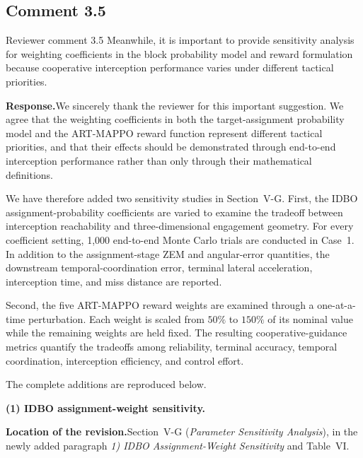 \documentclass[11pt]{article}
\newcommand{\rsp}{\medskip\noindent\textbf{Response.}\quad}
\newcommand{\loc}{\medskip\noindent\textbf{Location of the revision.}\quad}
\begin{document}

\subsection*{Comment 3.5}

\begin{reviewercomment}{Reviewer comment 3.5}
Meanwhile, it is important to provide sensitivity analysis for weighting
coefficients in the block probability model and reward formulation because
cooperative interception performance varies under different tactical
priorities.
\end{reviewercomment}

\rsp We sincerely thank the reviewer for this important suggestion. We agree
that the weighting coefficients in both the target-assignment probability
model and the ART-MAPPO reward function represent different tactical
priorities, and that their effects should be demonstrated through
end-to-end interception performance rather than only through their
mathematical definitions.

We have therefore added two sensitivity studies in
Section~V-G. First, the IDBO assignment-probability coefficients are varied
to examine the tradeoff between interception reachability and
three-dimensional engagement geometry. For every coefficient setting,
1,000 end-to-end Monte Carlo trials are conducted in Case~1. In addition to
the assignment-stage ZEM and angular-error quantities, the downstream
temporal-coordination error, terminal lateral acceleration, interception
time, and miss distance are reported.

Second, the five ART-MAPPO reward weights are examined through a
one-at-a-time perturbation. Each weight is scaled from $50\%$ to $150\%$ of
its nominal value while the remaining weights are held fixed. The resulting cooperative-guidance metrics quantify the
tradeoffs among reliability, terminal accuracy, temporal coordination,
interception efficiency, and control effort.

The complete additions are reproduced below.

\medskip
\noindent\textbf{(1) IDBO assignment-weight sensitivity.}

\loc Section~V-G (\emph{Parameter Sensitivity Analysis}), in the newly added
paragraph \emph{1) IDBO Assignment-Weight Sensitivity} and Table~VI.
\end{document}
